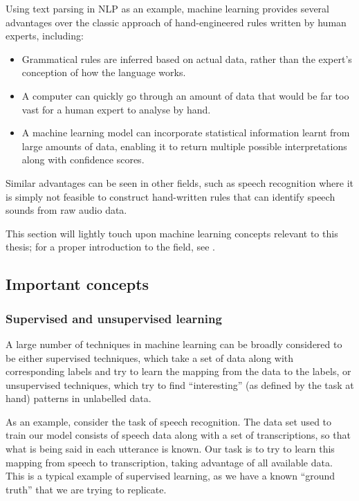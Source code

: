Using text parsing in NLP as an example, machine learning provides several advantages over the classic approach of hand-engineered rules written by human experts, including:
\begin{itemize}
 \item Grammatical rules are inferred based on actual data, rather than the expert's conception of how the language works.
 \item A computer can quickly go through an amount of data that would be far too vast for a human expert to analyse by hand.
 \item A machine learning model can incorporate statistical information learnt from large amounts of data, enabling it to return multiple possible interpretations along with confidence scores.
\end{itemize}
Similar advantages can be seen in other fields, such as speech recognition where it is simply not feasible to construct hand-written rules that can identify speech sounds from raw audio data.

This section will lightly touch upon machine learning concepts relevant to this thesis; for a proper introduction to the field, see \textcite{murphy2012machine}.

\subsection{Important concepts}
\subsubsection{Supervised and unsupervised learning}

A large number of techniques in machine learning can be broadly considered to be either supervised techniques, which take a set of data along with corresponding labels and try to learn the mapping from the data to the labels, or unsupervised techniques, which try to find ``interesting'' (as defined by the task at hand) patterns in unlabelled data.

As an example, consider the task of speech recognition.
The data set used to train our model consists of speech data along with a set of transcriptions, so that what is being said in each utterance is known.
Our task is to try to learn this mapping from speech to transcription, taking advantage of all available data.
This is a typical example of supervised learning, as we have a known ``ground truth'' that we are trying to replicate.

